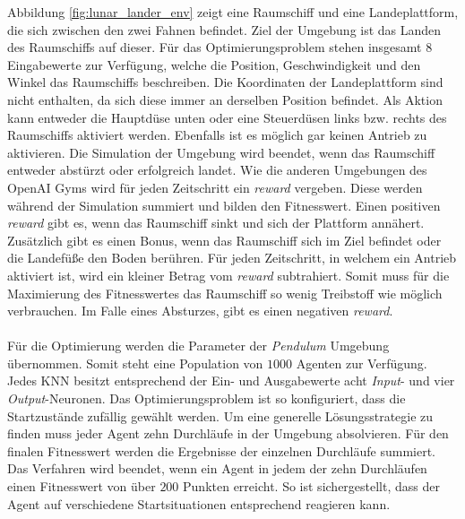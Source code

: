 Abbildung \ref{fig:lunar_lander_env} zeigt eine Raumschiff und eine Landeplattform, die sich zwischen den zwei Fahnen befindet. Ziel der Umgebung ist das Landen des Raumschiffs auf dieser. Für das Optimierungsproblem stehen insgesamt $8$ Eingabewerte zur Verfügung, welche die Position, Geschwindigkeit und den Winkel das Raumschiffs beschreiben. Die Koordinaten der Landeplattform sind nicht enthalten, da sich diese immer an derselben Position befindet. Als Aktion kann entweder die Hauptdüse unten oder eine Steuerdüsen links bzw. rechts des Raumschiffs aktiviert werden. Ebenfalls ist es möglich gar keinen Antrieb zu aktivieren. Die Simulation der Umgebung wird beendet, wenn das Raumschiff entweder abstürzt oder erfolgreich landet. Wie die anderen Umgebungen des OpenAI Gyms wird für jeden Zeitschritt ein \emph{reward} vergeben. Diese werden während der Simulation summiert und bilden den Fitnesswert. Einen positiven \emph{reward} gibt es, wenn das Raumschiff sinkt und sich der Plattform annähert. Zusätzlich gibt es einen Bonus, wenn das Raumschiff sich im Ziel befindet oder die Landefüße den Boden berühren. Für jeden Zeitschritt, in welchem ein Antrieb aktiviert ist, wird ein kleiner Betrag vom \emph{reward} subtrahiert. Somit muss für die Maximierung des Fitnesswertes das Raumschiff so wenig Treibstoff wie möglich verbrauchen. Im Falle eines Absturzes, gibt es einen negativen \emph{reward}.
\\\\
Für die Optimierung werden die Parameter der \emph{Pendulum} Umgebung übernommen. Somit steht eine Population von $1000$ Agenten zur Verfügung. Jedes \ac{KNN} besitzt entsprechend der Ein- und Ausgabewerte acht \emph{Input}- und vier \emph{Output}-Neuronen. Das Optimierungsproblem ist so konfiguriert, dass die Startzustände zufällig gewählt werden. Um eine generelle Lösungsstrategie zu finden muss jeder Agent zehn Durchläufe in der Umgebung absolvieren. Für den finalen Fitnesswert werden die Ergebnisse der einzelnen Durchläufe summiert. Das Verfahren wird beendet, wenn ein Agent in jedem der zehn Durchläufen einen Fitnesswert von über $200$ Punkten erreicht. So ist sichergestellt, dass der Agent auf verschiedene Startsituationen entsprechend reagieren kann.
